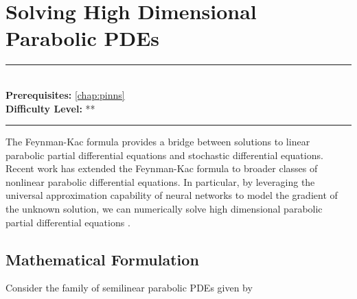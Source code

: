 \documentclass[book.tex]{subfiles}
\begin{document}
\chapter{Solving High Dimensional Parabolic PDEs }
\label{chap:high_dimensional}
\noindent\rule{11cm}{0.4pt} \\
\textbf{Prerequisites:} \autoref{chap:pinns} \\
\textbf{Difficulty Level:} ** \\
\noindent\rule{11cm}{0.4pt}
\vspace{5mm}

The Feynman-Kac formula provides a bridge between solutions to linear parabolic partial differential equations and stochastic differential equations. Recent work has extended the Feynman-Kac formula to broader classes of nonlinear parabolic differential equations. In particular, by leveraging the universal approximation capability of neural networks to model the gradient of the unknown solution, we can numerically solve high dimensional parabolic partial differential equations \cite{han2018solving}.



\section{Mathematical Formulation} 

Consider the family of semilinear parabolic PDEs given by
\end{document}
